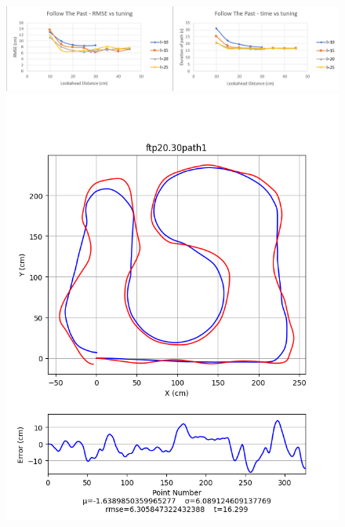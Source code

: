 \documentclass[mla8alt]{mla}
\begin{document}
\begin{paper}
\begin{figure}[H]
\includegraphics[width=\linewidth]{tuningGraphs/ftp}
\includegraphics[width=\linewidth]{pathData/ftppath1}
\endminipage\hfill
{}

\end{figure}
\end{paper}
\end{document}
